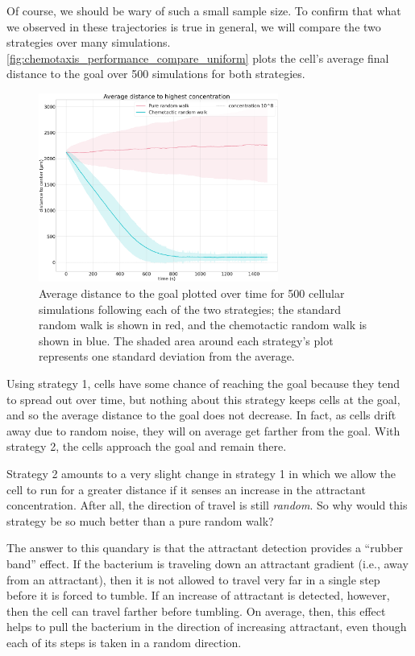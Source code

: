 Of course, we should be wary of such a small sample size. To confirm that what we observed in these trajectories is true in general, we will compare the two strategies over many simulations. \autoref{fig:chemotaxis_performance_compare_uniform} plots the cell's average final distance to the goal over 500 simulations for both strategies.

\begin{figure}[h]
\centering
\mySfFamily
\includegraphics[width = 0.7\textwidth]{../images/chemotaxis_performance_compare_uniform.png}
\caption{Average distance to the goal plotted over time for 500 cellular simulations following each of the two strategies; the standard random walk is shown in red, and the chemotactic random walk is shown in blue. The shaded area around each strategy's plot represents one standard deviation from the average.}
\label{fig:chemotaxis_performance_compare_uniform}
\end{figure}


Using strategy 1, cells have some chance of reaching the goal because they tend to spread out over time, but nothing about this strategy keeps cells at the goal, and so the average distance to the goal does not decrease. In fact, as cells drift away due to random noise, they will on average get farther from the goal. With strategy 2, the cells approach the goal and remain there.

Strategy 2 amounts to a very slight change in strategy 1 in which we allow the cell to run for a greater distance if it senses an increase in the attractant concentration. After all, the direction of travel is still \textit{random}. So why would this strategy be so much better than a pure random walk?

The answer to this quandary is that the attractant detection provides a ``rubber band'' effect. If the bacterium is traveling down an attractant gradient (i.e., away from an attractant), then it is not allowed to travel very far in a single step before it is forced to tumble. If an increase of attractant is detected, however, then the cell can travel farther before tumbling. On average, then, this effect helps to pull the bacterium in the direction of increasing attractant, even though each of its steps is taken in a random direction.

